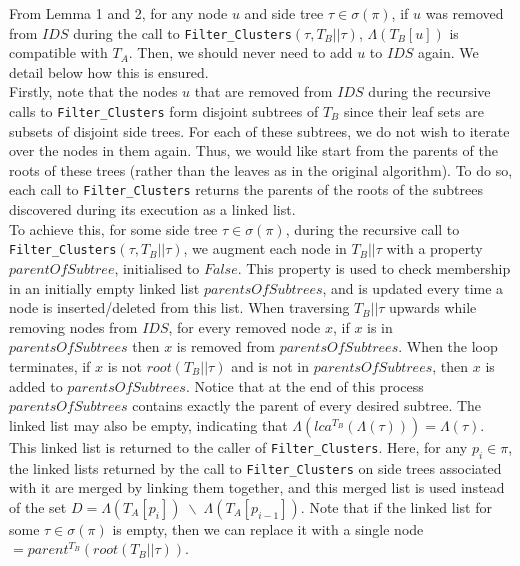 \documentclass{article}
\begin{document}
    From Lemma 1 and 2, for any node $u$ and side tree $\tau \in \sigma(\pi)$, if $u$ was removed from $IDS$ during the call to \texttt{Filter\_Clusters}$(\tau, T_B||\tau)$, $\Lambda(T_B[u])$ is compatible with $T_A$. Then, we should never need to add $u$ to $IDS$ again. We detail below how this is ensured.\\

    Firstly, note that the nodes $u$ that are removed from $IDS$ during the recursive calls to \texttt{Filter\_Clusters} form disjoint subtrees of $T_B$ since their leaf sets are subsets of disjoint side trees. For each of these subtrees, we do not wish to iterate over the nodes in them again. Thus, we would like start from the parents of the roots of these trees (rather than the leaves as in the original algorithm). To do so, each call to \texttt{Filter\_Clusters} returns the parents of the roots of the subtrees discovered during its execution as a linked list.\\

    To achieve this, for some side tree $\tau \in \sigma(\pi)$, during the recursive call to \texttt{Filter\_Clusters}$(\tau, T_B||\tau)$, we augment each node in $T_B||\tau$ with a property $parentOfSubtree$, initialised to $False$. This property is used to check membership in an initially empty linked list $parentsOfSubtrees$, and is updated every time a node is inserted/deleted from this list. When traversing $T_B||\tau$ upwards while removing nodes from $IDS$, for every removed node $x$, if $x$ is in $parentsOfSubtrees$ then $x$ is removed from $parentsOfSubtrees$. When the loop terminates, if $x$ is not $root(T_B||\tau)$ and is not in $parentsOfSubtrees$, then $x$ is added to $parentsOfSubtrees$. Notice that at the end of this process $parentsOfSubtrees$ contains exactly the parent of every desired subtree. The linked list may also be empty, indicating that $\Lambda(lca^{T_B}(\Lambda(\tau))) = \Lambda(\tau)$.\\

    This linked list is returned to the caller of \texttt{Filter\_Clusters}. Here, for any $p_i \in \pi$, the linked lists returned by the call to \texttt{Filter\_Clusters} on side trees associated with it are merged by linking them together, and this merged list is used instead of the set $D = \Lambda(T_A[p_i]) \;\backslash\; \Lambda(T_A[p_{i-1}])$. Note that if the linked list for some $\tau \in \sigma(\pi)$ is empty, then we can replace it with a single node $= parent^{T_B}(root(T_B||\tau))$.\\
\end{document}
